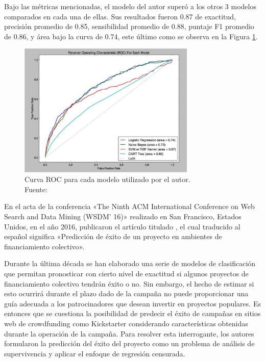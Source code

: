 Bajo las métricas mencionadas, el modelo del autor superó a los otros 3 modelos comparados en cada una de ellas. Sus resultados fueron 0.87 de exactitud, precisión promedio de 0.85, sensibilidad promedio de 0.88, puntaje F1 promedio de 0.86, y área bajo la curva de 0.74, este último como se observa en la Figura \ref{2:fig115}.

\begin{figure}[!ht]
	\begin{center}
		\includegraphics[width=0.75\textwidth]{2/figures/beckwith2016.jpg}
		\caption[Curva ROC para cada modelo utilizado por el autor]{Curva ROC para cada modelo utilizado por el autor.\\
		Fuente: \cite{pr_beckwith2016predcrowd}}
		\label{2:fig115}
	\end{center}
\end{figure}

\clearpage
En el acta de la conferencia «The Ninth ACM International Conference on Web Search and Data Mining (WSDM’ 16)» realizado en San Francisco, Estados Unidos, en el año 2016, \cite{pr_li2016predcrowd} publicaron el artículo titulado , el cual traducido al español significa «Predicción de éxito de un proyecto en ambientes de financiamiento colectivo».

Durante la última década se han elaborado una serie de modelos de clasificación que permitan pronosticar con cierto nivel de exactitud si algunos proyectos de financiamiento colectivo tendrán éxito o no. Sin embargo, el hecho de estimar si esto ocurrirá durante el plazo dado de la campaña no puede proporcionar una guía adecuada a los patrocinadores que desean invertir en proyectos populares. Es entonces que se cuestiona la posibilidad de predecir el éxito de campañas en sitios web de crowdfunding como Kickstarter considerando características obtenidas durante la operación de la campaña. Para resolver esta interrogante, los autores formularon la predicción del éxito del proyecto como un problema de análisis de supervivencia y aplicar el enfoque de regresión censurada.

